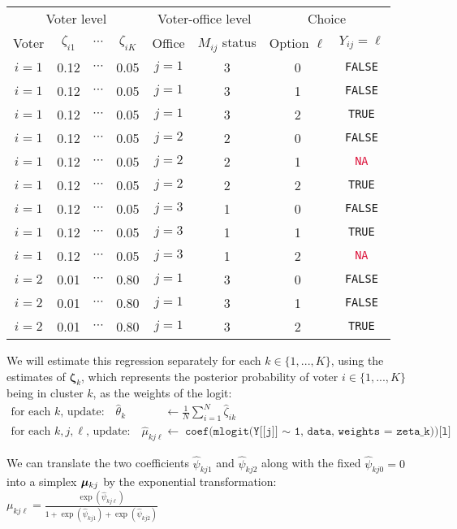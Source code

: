 \documentclass[11pt]{article}
\begin{document}
\begin{table}[!h]
\centering
\singlespacing
\begin{tabular}{cccccccc}
\toprule
\multicolumn{4}{c}{Voter level} & \multicolumn{2}{c}{Voter-office level} & \multicolumn{2}{c}{Choice}\\
\cmidrule(lr){1-4} \cmidrule(lr){5-6}\cmidrule(lr){7-8}
Voter     & \(\zeta_{i1}\) & \(\cdots\) & \(\zeta_{iK}\) &   Office & \(M_{ij}\) status & Option $\ell$ &  \(Y_{ij} = \ell\)\\\midrule
\(i = 1\) & 0.12 & \(\cdots\) & 0.05 &  \(j = 1\) & 3 & 0 & \texttt{FALSE}\\
\(i = 1\) & 0.12 & \(\cdots\) & 0.05 &  \(j = 1\) & 3 & 1 & \texttt{FALSE}\\
\(i = 1\) & 0.12 & \(\cdots\) & 0.05 &  \(j = 1\) & 3 & 2 & \texttt{TRUE}\\\addlinespace
\(i = 1\) & 0.12 & \(\cdots\) & 0.05 &  \(j = 2\) & 2 & 0 & \texttt{FALSE}\\
\(i = 1\) & 0.12 & \(\cdots\) & 0.05 &  \(j = 2\) & 2 & 1 & \textcolor{crimson}{\texttt{NA}}\\
\(i = 1\) & 0.12 & \(\cdots\) & 0.05 &  \(j = 2\) & 2 & 2 & \texttt{TRUE}\\\addlinespace
\(i = 1\) & 0.12 & \(\cdots\) & 0.05 &  \(j = 3\) & 1 & 0 & \texttt{FALSE}\\
\(i = 1\) & 0.12 & \(\cdots\) & 0.05 &  \(j = 3\) & 1 & 1 & \texttt{TRUE}\\
\(i = 1\) & 0.12 & \(\cdots\) & 0.05 &  \(j = 3\) & 1 & 2 & \textcolor{crimson}{\texttt{NA}}\\\addlinespace
\(i = 2\) & 0.01 & \(\cdots\) & 0.80 &  \(j = 1\) & 3 & 0 & \texttt{FALSE}\\
\(i = 2\) & 0.01 & \(\cdots\) & 0.80 &  \(j = 1\) & 3 & 1 & \texttt{FALSE}\\
\(i = 2\) & 0.01 & \(\cdots\) & 0.80 &  \(j = 1\) & 3 & 2 & \texttt{TRUE}\\
\bottomrule
\end{tabular}
\end{table}

We will estimate this regression separately for each \(k \in \{1, ..., K\}\), using the estimates of \(\bm{\zeta}_{k}\), which represents the posterior probability of voter \(i \in \{1, ..., K\}\) being in cluster \(k\), as the weights of the logit:
\begin{align}
\text{for each \(k\), update: }~~~  \widehat{\theta}_{k} &\leftarrow \frac{1}{N}\sum^N_{i = 1}\widehat{\zeta}_{ik} \\
\text{for each \(k, j, \ell\), update: }~~~ \widehat{\mu}_{kj\ell} &\leftarrow \texttt{coef(mlogit(Y[[j]] \(\sim\) 1, data, weights = zeta\_k))[l]}
\end{align}

We can translate the two coefficients \(\widehat\psi_{kj1}\) and  \(\widehat\psi_{kj2}\) along with the fixed \(\widehat\psi_{kj0} = 0\) into a simplex \(\bm{\mu}_{kj}\) by  the exponential transformation: \(\mu_{kj\ell} = \frac{\exp\left(\widehat\psi_{kj\ell}\right)}{1 + \exp\left(\widehat\psi_{kj1}\right) + \exp\left(\widehat\psi_{kj2}\right)}\)
\end{document}

